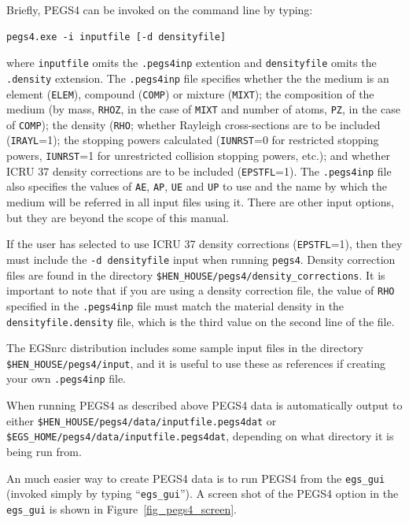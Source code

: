 \documentclass[12pt,twoside]{article}
\begin{document}
Briefly, PEGS4 can be invoked on the command line by typing:
\begin{verbatim}
pegs4.exe -i inputfile [-d densityfile]
\end{verbatim}
where {\tt inputfile} omits the {\tt .pegs4inp} extention and
{\tt densityfile} omits the {\tt .density} extension.  The {\tt .pegs4inp}
file specifies whether the the medium is an element ({\tt ELEM}),
compound ({\tt COMP}) or mixture ({\tt MIXT}); the composition of
the medium (by mass, {\tt RHOZ}, in the case of {\tt MIXT} and
number of atoms, {\tt PZ}, in the case of {\tt COMP}); the density ({\tt RHO};
whether Rayleigh cross-sections are to be included ({\tt IRAYL}=1);
the stopping powers calculated ({\tt IUNRST}=0 for restricted stopping
powers, {\tt IUNRST}=1 for unrestricted collision stopping powers, etc.);
and whether ICRU 37 density corrections are to be included
({\tt EPSTFL}=1).  The {\tt .pegs4inp} file also specifies the
values of {\tt AE}, {\tt AP}, {\tt UE} and {\tt UP} to use and the
name by which the medium will be referred in all input files using it.
There are other input options, but they are beyond the scope of this
manual.

If the user has selected to use ICRU 37 density corrections ({\tt EPSTFL}=1),
then they must include the {\tt -d densityfile} input when running
{\tt pegs4}.  Density correction files are found in the directory
{\tt \$HEN\_HOUSE/pegs4/density\_corrections}.  It is important to note that
if you are using a density correction file, the value of {\tt RHO} specified
in the {\tt .pegs4inp} file must match the material density in the
{\tt densityfile.density} file, which is the third value on the second
line of the file.

The EGSnrc distribution includes some sample input files in the
directory {\tt \$HEN\_HOUSE/pegs4/input}, and it is useful to use these
as references if creating your own {\tt .pegs4inp} file.

When running PEGS4 as described above PEGS4 data is automatically output
to either
{\tt \$HEN\_HOUSE/pegs4/data/inputfile.pegs4dat} or
{\tt \$EGS\_HOME/pegs4/data/inputfile.pegs4dat}, depending on what
directory it is being run from.

An much easier way to create PEGS4 data is to run PEGS4 from
the {\tt egs\_gui} (invoked simply by typing ``{\tt egs\_gui}'').  A screen
shot of the PEGS4 option in the {\tt egs\_gui} is shown in
Figure~\ref{fig_pegs4_screen}.
\end{document}
